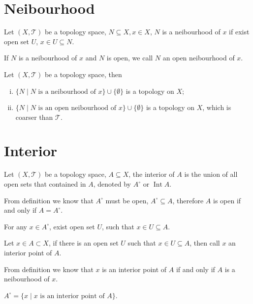 \section{Neibourhood}
\begin{defi}
Let $(X, \mathcal{T})$ be a topology space,
$N \subseteq X, x \in X$, $N$ is a neibourhood of $x$ if
exist open set $U$, $x \in U \subseteq N$.
\end{defi}
If $N$ is a neibourhood of $x$ and $N$ is open, we call $N$ an open neibourhood of $x$.

\begin{pro}
Let $(X, \mathcal{T})$ be a topology space, then
\begin{enumerate}[i).]
\item $\{N \mid N\mbox{ is a neibourhood of }x\} \cup \{\emptyset\}$ is a topology on $X$;
\item $\{N \mid N\mbox{ is an open neibourhood of }x\} \cup \{\emptyset\}$ is a topology on $X$,
which is coarser than $\mathcal{T}$.
\end{enumerate}
\end{pro}


\section{Interior}
\begin{defi}
Let $(X, \mathcal{T})$ be a topology space, $A \subseteq X$,
the interior of $A$ is the union of all open sets that contained in $A$,
denoted by $A^\circ$ or $\mathop{\mathrm{Int}} A$.
\end{defi}
From definition we know that $A^\circ$ must be open,
$A^\circ \subseteq A$, therefore $A$ is open if and only if $A = A^\circ$.
\begin{pro}
For any $x \in A^\circ$, exist open set $U$,
such that $x \in U \subseteq A$.
\end{pro}
\begin{defi}
Let $x \in A \subset X$, if there is an open set $U$
such that $x \in U \subseteq A$, then call $x$ an interior point of $A$.
\end{defi}
From definition we know that $x$ is an interior point of $A$ if and only if $A$ is a neibourhood of $x$.
\begin{pro}
$A^\circ = \{x \mid x\mbox{ is an interior point of }A\}$.
\end{pro}


